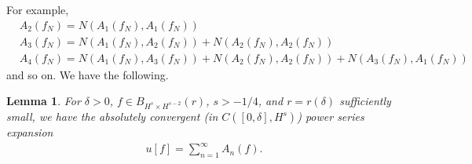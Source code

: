 \documentclass[12pt,reqno]{amsart}
\numberwithin{equation}{section}  %
\newtheorem{lemma}[theorem]{Lemma}
\begin{document}
%
%
%
For example, 
%
%
\begin{equation*}
\begin{split}
  & A_{2}(f_{N}) = N(A_{1}(f_{N}), A_{1}(f_{N}))
  \\
  & A_{3}(f_{N}) = N(A_{1}(f_{N}), A_{2}(f_{N})) + N(A_{2}(f_{N}), A_{2}(f_{N}))
  \\
  & A_{4}(f_{N})= N(A_{1}(f_{N}), A_{3}(f_{N})) + N(A_{2}(f_{N}), A_{2}(f_{N}))
  + N(A_{3}(f_{N}), A_{1}(f_{N}))
\end{split}
\end{equation*}
%
%
and so on. We have the following.
\begin{lemma}
  \label{lem:qwp-awp}
  For $\delta > 0$, $f \in B_{H^{s} \times H^{s-2}}(r)$, $s > -1/4$,  and $r = r(\delta)$
sufficiently small, we have the absolutely convergent
(in $C([0,\delta], H^{s})$) power series expansion
%
%
\begin{equation}
  \label{power-series-soln}
\begin{split}
  u[f] = \sum_{n=1}^{\infty} A_{n}(f).
\end{split}
\end{equation}
%
%
\label{lem:analytic-wp}
\end{lemma}
%
%
%
%
%
%
%
%
%
%
\end{document}
